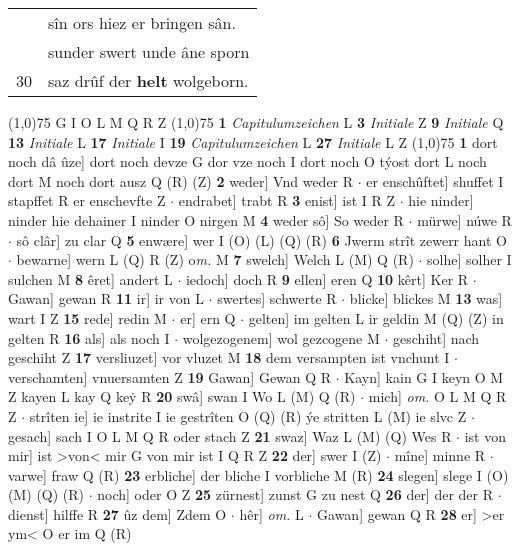 \documentclass[8pt,a4paper,notitlepage]{article}
\begin{document}
\begin{table}[ht]
\begin{minipage}[t]{0.5\linewidth}
\begin{tabular}{rl}
 & sîn ors hiez er bringen sân.\\ 
 & sunder swert unde âne sporn\\ 
30 & saz drûf der \textbf{helt} wolgeborn.\\ 
\end{tabular}
\scriptsize
\line(1,0){75} \newline
G I O L M Q R Z \newline
\line(1,0){75} \newline
\textbf{1} \textit{Capitulumzeichen} L  \textbf{3} \textit{Initiale} Z  \textbf{9} \textit{Initiale} Q  \textbf{13} \textit{Initiale} L  \textbf{17} \textit{Initiale} I  \textbf{19} \textit{Capitulumzeichen} L  \textbf{27} \textit{Initiale} L Z  \newline
\line(1,0){75} \newline
\textbf{1} dort noch dâ ûze] dort noch devze G dor vze noch I dort noch O týost dort L noch dort M noch dort ausz Q (R) (Z) \textbf{2} weder] Vnd weder R  $\cdot$ er enschûftet] shuffet I stapffet R er enschevfte Z  $\cdot$ endrabet] trabt R \textbf{3} enist] ist I R Z  $\cdot$ hie ninder] ninder hie dehainer I ninder O nirgen M \textbf{4} weder sô] So weder R  $\cdot$ mürwe] núwe R  $\cdot$ sô clâr] zu clar Q \textbf{5} enwære] wer I (O) (L) (Q) (R) \textbf{6} Jwerm strît zewerr hant O  $\cdot$ bewarne] wern L (Q) R (Z) o\textit{m. } M \textbf{7} swelch] Welch L (M) Q (R)  $\cdot$ solhe] solher I sulchen M \textbf{8} êret] andert L  $\cdot$ iedoch] doch R \textbf{9} ellen] eren Q \textbf{10} kêrt] Ker R  $\cdot$ Gawan] gewan R \textbf{11} ir] ir von L  $\cdot$ swertes] schwerte R  $\cdot$ blicke] blickes M \textbf{13} was] wart I Z \textbf{15} rede] redin M  $\cdot$ er] ern Q  $\cdot$ gelten] im gelten L ir geldin M (Q) (Z) in gelten R \textbf{16} als] als noch I  $\cdot$ wolgezogenem] wol gezcogene M  $\cdot$ geschiht] nach geschiht Z \textbf{17} versliuzet] vor vluzet M \textbf{18} dem versampten ist vnchunt I  $\cdot$ verschamten] vnuersamten Z \textbf{19} Gawan] Gewan Q R  $\cdot$ Kayn] kain G I keyn O M Z kayen L kay Q keẏ R \textbf{20} swâ] swan I Wo L (M) Q (R)  $\cdot$ mich] \textit{om.} O L M Q R Z  $\cdot$ strîten ie] ie instrite I ie gestrîten O (Q) (R) ýe stritten L (M) ie slvc Z  $\cdot$ gesach] sach I O L M Q R oder stach Z \textbf{21} swaz] Waz L (M) (Q) Wes R  $\cdot$ ist von mir] ist >von< mir G von mir ist I Q R Z \textbf{22} der] swer I (Z)  $\cdot$ mîne] minne R  $\cdot$ varwe] fraw Q (R) \textbf{23} erbliche] der bliche I vorbliche M (R) \textbf{24} slegen] slege I (O) (M) (Q) (R)  $\cdot$ noch] oder O Z \textbf{25} zürnest] zunst G zu nest Q \textbf{26} der] der der R  $\cdot$ dienst] hilffe R \textbf{27} ûz dem] Zdem O  $\cdot$ hêr] \textit{om.} L  $\cdot$ Gawan] gewan Q R \textbf{28} er] >er ym< O er im Q (R) \newline

\end{minipage}
\end{table}
\end{document}
